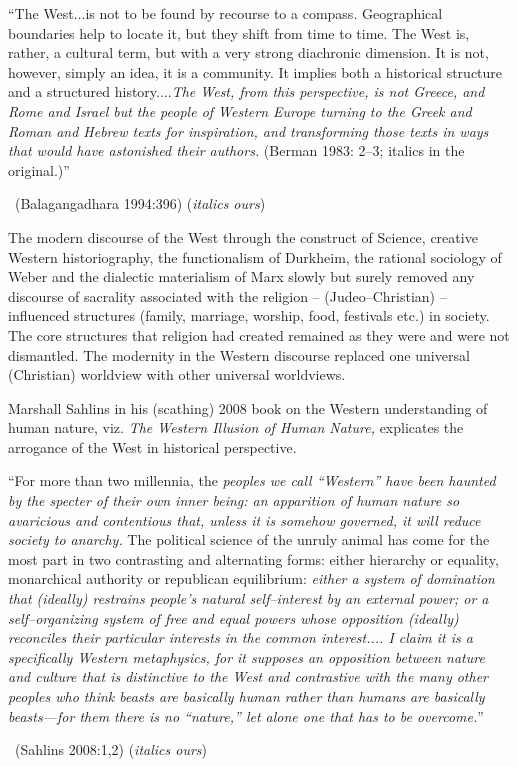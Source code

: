 \begin{myquote}
“The West...is not to be found by recourse to a compass. Geographical boundaries help to locate it, but they shift from time to time. The West is, rather, a cultural term, but with a very strong diachronic dimension. It is not, however, simply an idea, it is a community. It implies both a historical structure and a structured history....\textit{The West, from this perspective, is not Greece, and Rome and Israel but the people of Western Europe turning to the Greek and Roman and Hebrew texts for inspiration, and transforming those texts in ways that would have astonished their authors.} (Berman 1983: 2–3; italics in the original.)” 

~\hfill (Balagangadhara 1994:396) (\textit{italics ours})
\end{myquote}

The modern discourse of the West through the construct of Science, creative Western historiography, the functionalism of Durkheim, the rational sociology of Weber and the dialectic materialism of Marx slowly but surely removed any discourse of sacrality associated with the religion – (Judeo–Christian) – influenced structures (family, marriage, worship, food, festivals etc.) in society. The core structures that religion had created remained as they were and were not dismantled. The modernity in the Western discourse replaced one universal (Christian) worldview with other universal worldviews.

Marshall Sahlins in his (scathing) 2008 book on the Western understanding of human nature, viz. \textit{The Western Illusion of Human Nature,} explicates the arrogance of the West in historical perspective.

\begin{myquote}
“For more than two millennia, the \textit{peoples we call “Western” have been haunted by the specter of their own inner being: an apparition of human nature so avaricious and contentious that, unless it is somehow governed, it will reduce society to anarchy.} The political science of the unruly animal has come for the most part in two contrasting and alternating forms: either hierarchy or equality, monarchical authority or republican equilibrium: \textit{either a system of domination that (ideally) restrains people's natural self–interest by an external power; or a self–organizing system of free and equal powers whose opposition (ideally) reconciles their particular interests in the common interest.... I claim it is a specifically Western metaphysics, for it supposes an opposition between nature and culture that is distinctive to the West and contrastive with the many other peoples who think beasts are basically human rather than humans are basically beasts—for them there is no “nature,” let alone one that has to be overcome.}” 

~\hfill (Sahlins 2008:1,2) (\textit{italics ours})
\end{myquote}


